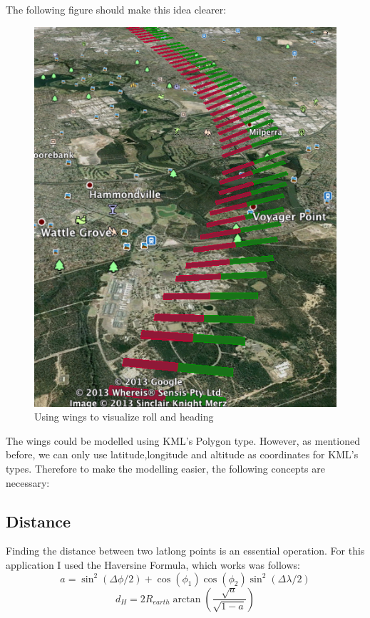 The following figure should make this idea clearer:\\

\begin{figure}[h]
\caption{Using wings to visualize roll and heading}
\centering
\includegraphics[scale=0.5]{gfx/roll-sample.png}
\end{figure}

The wings could be modelled using KML's Polygon type. However, as mentioned before, we can only use latitude,longitude and altitude as coordinates for KML's types. Therefore to make the modelling easier, the following concepts are necessary:

\subsection{Distance}

Finding the distance between two latlong points is an essential operation. For this application I used the Haversine Formula, which works was follows\citep{latlong}:
\begin{equation}
  a = \sin^2(\Delta\phi/2) + \cos(\phi_{1}) \cos(\phi_{2})\sin^2(\Delta\lambda/2)
\end{equation}
\begin{equation}
  d_{H} = 2 R_{earth} \arctan(\frac{\sqrt{a}}{\sqrt{1 - a}})
\end{equation}

